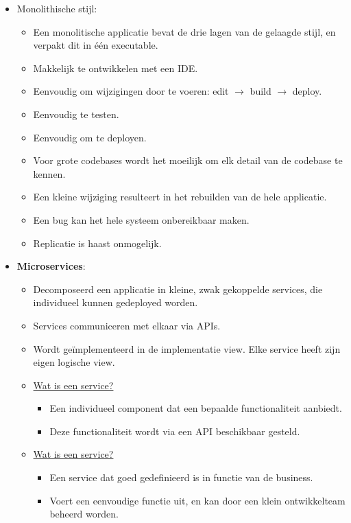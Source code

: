 \documentclass{report}
\begin{document}
\begin{itemize}
\begin{itemize}
		\end{itemize}
		\item[\info] Monolithische stijl:
		\begin{itemize}
			\item[\info] Een monolitische applicatie bevat de drie lagen van de gelaagde stijl, en verpakt dit in één executable.
			\item[\good] Makkelijk te ontwikkelen met een IDE.
			\item[\good] Eenvoudig om wijzigingen door te voeren: edit $\rightarrow$ build $\rightarrow$ deploy.
			\item[\good] Eenvoudig te testen.
			\item[\good] Eenvoudig om te deployen.
			\item[\alert] Voor grote codebases wordt het moeilijk om elk detail van de codebase te kennen.
			\item[\alert] Een kleine wijziging resulteert in het rebuilden van de hele applicatie.
			\item[\alert] Een bug kan het hele systeem onbereikbaar maken.
			\item[\alert] Replicatie is haast onmogelijk. 
		\end{itemize}
		\item[\info] \textbf{Microservices}:
		\begin{itemize}
			\item[\info] Decomposeerd een applicatie in kleine, zwak gekoppelde services, die individueel kunnen gedeployed worden.
			\item[\info] Services communiceren met elkaar via APIs.
			\item[\info] Wordt geïmplementeerd in de implementatie view. Elke service heeft zijn eigen logische view.
			\item[\info] \underline{Wat is een service?}
			\begin{itemize}
				\item[\info] Een individueel component dat een bepaalde functionaliteit aanbiedt.
				\item[\info] Deze functionaliteit wordt via een API beschikbaar gesteld. 
			\end{itemize}
			\item[\info] \underline{Wat is een service?}
			\begin{itemize}
				\item[\info] Een service dat goed gedefinieerd is in functie van de business.
				\item[\info] Voert een eenvoudige functie uit, en kan door een klein ontwikkelteam beheerd worden.

\end{itemize}
\end{itemize}
\end{itemize}
\end{document}
